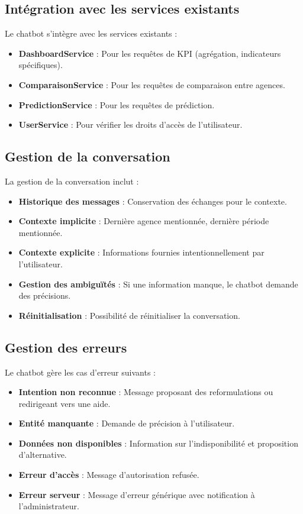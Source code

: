 \subsection{Intégration avec les services existants}

Le chatbot s'intègre avec les services existants :

\begin{itemize}
    \item \textbf{DashboardService} : Pour les requêtes de KPI (agrégation, indicateurs spécifiques).
    \item \textbf{ComparaisonService} : Pour les requêtes de comparaison entre agences.
    \item \textbf{PredictionService} : Pour les requêtes de prédiction.
    \item \textbf{UserService} : Pour vérifier les droits d'accès de l'utilisateur.
\end{itemize}

\subsection{Gestion de la conversation}

La gestion de la conversation inclut :

\begin{itemize}
    \item \textbf{Historique des messages} : Conservation des échanges pour le contexte.
    \item \textbf{Contexte implicite} : Dernière agence mentionnée, dernière période mentionnée.
    \item \textbf{Contexte explicite} : Informations fournies intentionnellement par l'utilisateur.
    \item \textbf{Gestion des ambiguïtés} : Si une information manque, le chatbot demande des précisions.
    \item \textbf{Réinitialisation} : Possibilité de réinitialiser la conversation.
\end{itemize}

\subsection{Gestion des erreurs}

Le chatbot gère les cas d'erreur suivants :

\begin{itemize}
    \item \textbf{Intention non reconnue} : Message proposant des reformulations ou redirigeant vers une aide.
    \item \textbf{Entité manquante} : Demande de précision à l'utilisateur.
    \item \textbf{Données non disponibles} : Information sur l'indisponibilité et proposition d'alternative.
    \item \textbf{Erreur d'accès} : Message d'autorisation refusée.
    \item \textbf{Erreur serveur} : Message d'erreur générique avec notification à l'administrateur.
\end{itemize}

